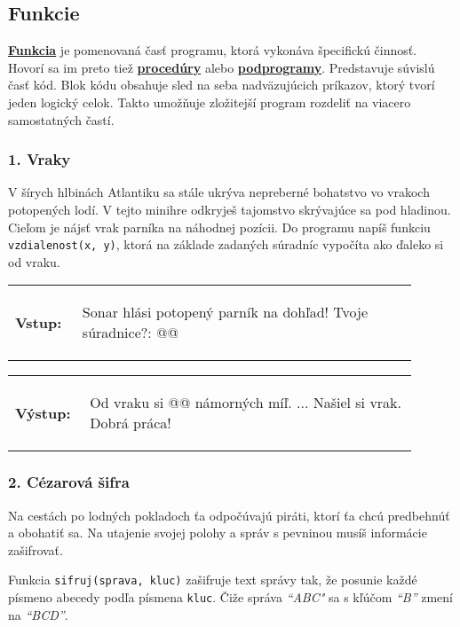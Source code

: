 \subsection{Funkcie}
\underline{\textbf{Funkcia}} je pomenovaná časť programu, ktorá vykonáva špecifickú činnosť. Hovorí sa im preto tiež \underline{\textbf{procedúry}} alebo \underline{\textbf{podprogramy}}. Predstavuje súvislú časť kód. Blok kódu obsahuje sled na seba nadväzujúcich príkazov, ktorý tvorí jeden logický celok. Takto umožňuje zložitejší program rozdeliť na viacero samostatných častí.

\subsubsection*{1. Vraky}
V šírych hlbinách Atlantiku sa stále ukrýva nepreberné bohatstvo vo vrakoch potopených lodí. V tejto minihre odkryješ tajomstvo skrývajúce sa pod hladinou. Cieľom je nájsť vrak parníka na náhodnej pozícii. Do programu napíš funkciu \verb|vzdialenost(x, y)|, ktorá na základe zadaných súradníc vypočíta ako ďaleko si od vraku.

\begin{tabular}{@{}p{0.15\linewidth}p{0.75\linewidth}}
\textbf{\small Vstup:} &
\vspace{-3em}
\begin{code}
Sonar hlási potopený parník na dohľad!
Tvoje súradnice?: @\fbox{\phantom{123}}@
\end{code}
\end{tabular}

\vspace{-2em}
\begin{tabular}{@{}p{0.15\linewidth}p{0.75\linewidth}}
\textbf{\small Výstup:} &
\vspace{-3em}
\begin{code}
Od vraku si @\fbox{\phantom{vstup}}@ námorných míľ.
...
Našiel si vrak. Dobrá práca!
\end{code}
\end{tabular}
\vspace{-2em}


\subsubsection*{2. Cézarová šifra}
Na cestách po lodných pokladoch ťa odpočúvajú piráti, ktorí ťa chcú predbehnúť a obohatiť sa. Na utajenie svojej polohy a správ s pevninou musíš informácie zašifrovať.

Funkcia \verb|sifruj(sprava, kluc)| zašifruje text správy tak, že posunie každé písmeno abecedy podľa písmena \verb|kluc|. Čiže správa \emph{``ABC"} sa s kľúčom \emph{``B''} zmení na \emph{``BCD''}.

